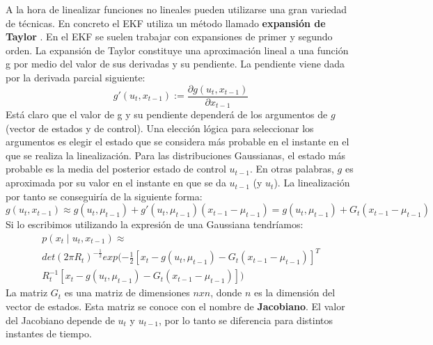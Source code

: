 A la hora de linealizar funciones no lineales pueden utilizarse una gran variedad de técnicas.
En concreto el \ac{EKF} utiliza un método llamado \textbf{expansión de Taylor} \cite{_taylor_2016}.
En el \ac{EKF} se suelen trabajar con expansiones de primer y segundo orden.
La expansión de Taylor constituye una aproximación lineal a una función g por medio del valor de sus derivadas y su pendiente.
La pendiente viene dada por la derivada parcial siguiente:
\begin{equation}\label{Ec:Taylor_1}
g'(u_{t},x_{t-1}) := \frac{\partial g(u_{t},x_{t-1})}{\partial x_{t-1}}
\end{equation}
Está claro que el valor de g y su pendiente dependerá de los argumentos de $g$ (vector de estados y de control).
Una elección lógica para seleccionar los argumentos es elegir el estado que se considera más probable en el instante en el que se realiza la linealización.
Para las distribuciones Gaussianas, el estado más probable es la media del posterior estado de control $u_{t-1}$.
En otras palabras, $g$ es aproximada por su valor en el instante en que se da $u_{t-1}$ (y $u_t$).
La linealización por tanto se conseguiría de la siguiente forma:
\begin{equation}\label{Ec:Taylor_2}
g(u_{t},x_{t-1}) \approx g(u_{t},\mu_{t-1}) + g'(u_{t},\mu_{t-1})(x_{t-1}-\mu_{t-1}) 
= g(u_{t},\mu_{t-1}) + G_{t}(x_{t-1}-\mu_{t-1})
\end{equation}
Si lo escribimos utilizando la expresión de una Gaussiana tendríamos:
\begin{eqnarray}\label{Ec:Prob_Taylor}
\nonumber p(x_{t} \mid u_{t},x_{t-1}) \approx \\
\nonumber det(2\pi R_{t})^{-\frac{1}{2}}exp(-\frac{1}{2}[x_{t}-g(u_{t},\mu_{t-1})-G_{t}(x_{t-1}-\mu_{t-1})]^{T} \\
R_{t}^{-1}[x_{t}-g(u_{t},\mu_{t-1})-G_{t}(x_{t-1}-\mu_{t-1})])
\end{eqnarray}
La matriz $G_{t}$ es una matriz de dimensiones $nxn$, donde $n$ es la dimensión del vector de estados.
Esta matriz se conoce con el nombre de \textbf{Jacobiano}.
El valor del Jacobiano depende de $u_{t}$ y $u_{t-1}$, por lo tanto se diferencia para distintos instantes de tiempo.

